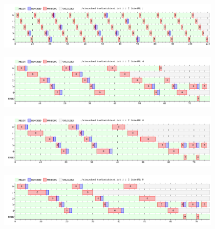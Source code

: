 \begin{figure}[H]
  \centering
\includegraphics[scale=0.45]{graficos/ejercicio7/testTask1.png}
  \caption[Task Batch con un nucleao y quantum 1]{}
\end{figure}


\begin{figure}[H]
  \centering
\includegraphics[scale=0.45]{graficos/ejercicio7/testTask4.png}
  \caption[Task Batch con un nucleo y quantum 4]{}
\end{figure}


\begin{figure}[H]
  \centering
\includegraphics[scale=0.45]{graficos/ejercicio7/testTask6.png}
  \caption[Task Batch con un nucleo y quantum 6]{}
\end{figure}


\begin{figure}[H]
  \centering
\includegraphics[scale=0.45]{graficos/ejercicio7/testTask8.png}
  \caption[Task Batch con un nucleo y  quantum 8]{}
\end{figure}
 
